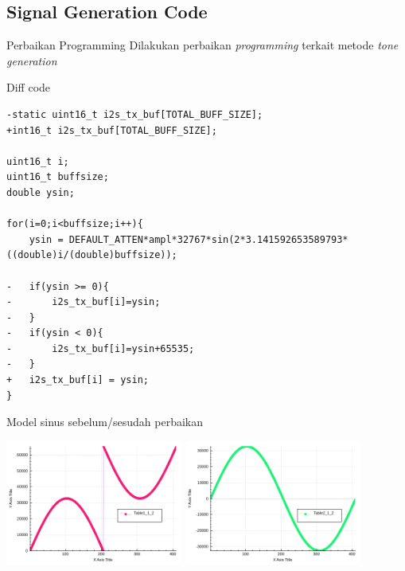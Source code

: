 \documentclass[table,dvipsnames]{beamer}
\begin{document}
	\begin{frame}[fragile]
		\subsection{Signal Generation Code}
		\begin{exampleblock}{Perbaikan Programming}
			Dilakukan perbaikan \textit{programming} terkait metode \textit{tone generation}
		\end{exampleblock}

		\begin{exampleblock}{Diff code}
			\begin{verbatim}
-static uint16_t i2s_tx_buf[TOTAL_BUFF_SIZE];
+int16_t i2s_tx_buf[TOTAL_BUFF_SIZE];

uint16_t i;
uint16_t buffsize;
double ysin;

for(i=0;i<buffsize;i++){
	ysin = DEFAULT_ATTEN*ampl*32767*sin(2*3.141592653589793*((double)i/(double)buffsize));

-	if(ysin >= 0){
-		i2s_tx_buf[i]=ysin;
-	}
-	if(ysin < 0){
-		i2s_tx_buf[i]=ysin+65535;
-	}
+ 	i2s_tx_buf[i] = ysin;
}
			\end{verbatim}
		\end{exampleblock}
	\end{frame}

	\begin{frame}
		\begin{exampleblock}{Model sinus sebelum/sesudah perbaikan}
			\begin{center}
				\includegraphics[width=165pt]{images/weird_sine}
				\includegraphics[width=165pt]{images/normal_sine}
			\end{center}
		\end{exampleblock}
	\end{frame}
\end{document}

